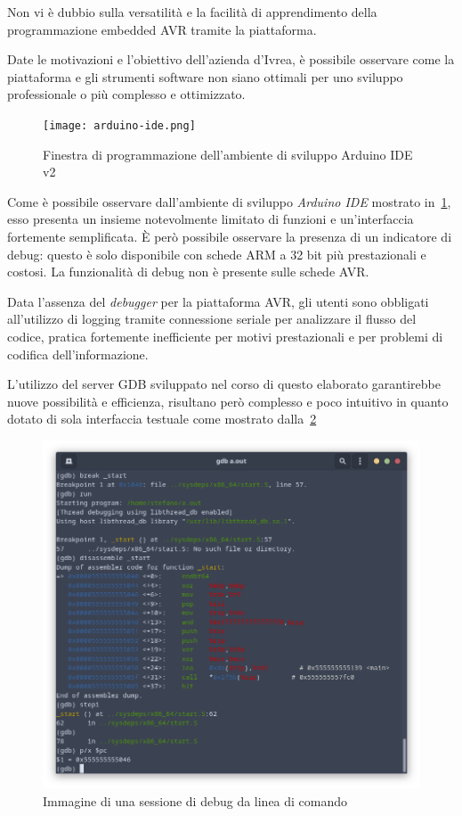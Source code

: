 Non vi è dubbio sulla versatilità e la facilità di apprendimento della programmazione embedded AVR tramite la piattaforma.

Date le motivazioni e l'obiettivo dell'azienda d'Ivrea, è possibile osservare come la piattaforma e gli strumenti software non siano ottimali per uno sviluppo professionale o più complesso e ottimizzato.

\begin{figure}
    \centering
    \texttt{[image: arduino-ide.png]}
    \caption[Immagine del software Arduino IDE v2]{Finestra di programmazione dell'ambiente di sviluppo Arduino IDE v2}\label{fig:arduino-ide}
\end{figure}

Come è possibile osservare dall'ambiente di sviluppo \textit{Arduino IDE} mostrato in~\cref{fig:arduino-ide}, esso presenta un insieme notevolmente limitato di funzioni e un'interfaccia fortemente semplificata. È però possibile osservare la presenza di un indicatore di debug: questo è solo disponibile con schede ARM a 32 bit più prestazionali e costosi. La funzionalità di debug non è presente sulle schede AVR.\@

Data l'assenza del \textit{debugger} per la piattaforma AVR, gli utenti sono obbligati all'utilizzo di logging tramite connessione seriale per analizzare il flusso del codice, pratica fortemente inefficiente per motivi prestazionali e per problemi di codifica dell'informazione.

L'utilizzo del server GDB sviluppato nel corso di questo elaborato garantirebbe nuove possibilità e efficienza, risultano però complesso e poco intuitivo in quanto dotato di sola interfaccia testuale come mostrato dalla~\cref{fig:gdb-cli}

\begin{figure}
    \centering
    \includegraphics[width=.7\textwidth]{gdb-cli.png}
    \caption[]{Immagine di una sessione di debug da linea di comando}\label{fig:gdb-cli}
\end{figure}

